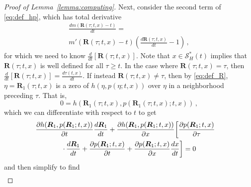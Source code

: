 \documentclass[10pt,conference]{ieeeconf}
\renewcommand{\(}{\left(}
\renewcommand{\)}{\right)}
\renewcommand{\[}{\left[}
\renewcommand{\]}{\right]}
\newcommand{\regularversion}[1]{\iffalse{}#1\fi}
\newcommand{\extendedversion}[1]{{\color{black}#1}}
\begin{document}
\begin{proof}[Proof of Lemma~\ref{lemma:computing}]
Next, consider the second term of \eqref{eq:def_hp}, which has total derivative
\extendedversion{\begin{multline}
    \frac{d m(\boldsymbol{R}(\tau;t,x) - t)}{dt} = \\ m'(\boldsymbol{R}(\tau;t,x) - t) \left( \frac{d \boldsymbol{R}(\tau;t,x)}{dt} - 1\right) \,, \label{eq:diff_second_term}
\end{multline}}%
\regularversion{\begin{equation}
    \frac{d m(\boldsymbol{R}(\tau;t,x) - t)}{dt} \hspace{-1pt}=\hspace{-1pt} m'(\boldsymbol{R}(\tau;t,x) - t) \left( \frac{d \boldsymbol{R}(\tau;t,x)}{dt} - 1\right), \label{eq:diff_second_term}
\end{equation}}%
for which we need to know $\frac{d}{dt}[\boldsymbol{R}(\tau;t,x)]$. {Note that $x\in\mathcal{S}_H^*(t)$ implies that $\boldsymbol{R}(\tau;t,x)$ is well defined for all $\tau \geq t$.}
In the case where $\boldsymbol{R}(\tau;t,x) = \tau$, then $\frac{d}{dt}[\boldsymbol{R}(\tau;t,x)] = \frac{d\tau(t,x)}{dt}$. 
If instead $\boldsymbol{R}(\tau;t,x) \neq \tau$, then by \eqref{eq:def_R}, $\eta = \boldsymbol{R}_1(\tau;t,x)$ is a zero of $h(\eta,p(\eta;t,x))$ over $\eta$ in a neighborhood preceding $\tau$. That is,
\begin{equation}
    0 = h(\boldsymbol{R}_1(\tau;t,x),p(\boldsymbol{R}_1(\tau;t,x);t,x)) \,,
\end{equation}
which we can differentiate with respect to $t$ to get
\begin{multline}
    \hspace{-10pt}\frac{\partial h(\boldsymbol{R}_1,p(\boldsymbol{R}_1;t,x))}{\partial t} \frac{d \boldsymbol{R}_1}{dt} + \frac{\partial h(\boldsymbol{R}_1,p(\boldsymbol{R}_1;t,x))}{\partial x} \hspace{-1.5pt}\left[ \frac{\partial p(\boldsymbol{R}_1;t,x)}{\partial \tau} \right. \\ \left. \cdot\, \frac{d\boldsymbol{R}_1}{dt}  + \frac{\partial p(\boldsymbol{R}_1;t,x)}{\partial t} + \frac{\partial p(\boldsymbol{R}_1;t,x)}{\partial x} \frac{dx}{dt} \right] = 0\label{eq:diff_R} 
\end{multline}
and then simplify\regularversion{\cite{extended_version}} to find
\extendedversion{\begin{align}

\end{align}}
\end{proof}
\end{document}
